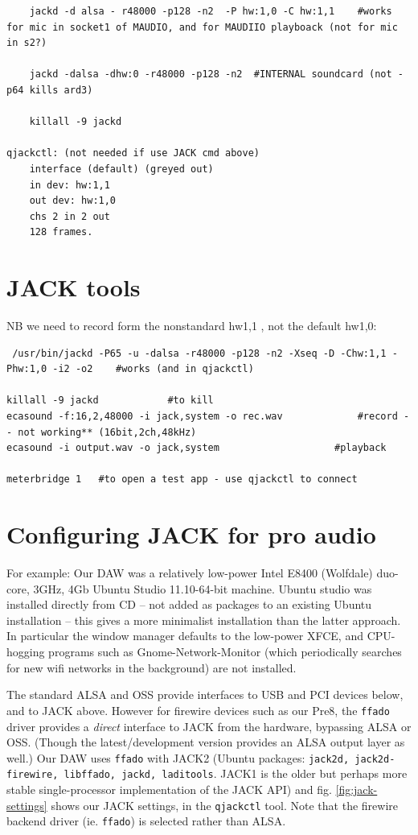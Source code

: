 \documentclass[oneside,english]{scrbook}
\begin{document}
\begin{lstlisting}
    jackd -d alsa - r48000 -p128 -n2  -P hw:1,0 -C hw:1,1    #works for mic in socket1 of MAUDIO, and for MAUDIIO playboack (not for mic in s2?)

	jackd -dalsa -dhw:0 -r48000 -p128 -n2  #INTERNAL soundcard (not -p64 kills ard3)
	
	killall -9 jackd

qjackctl: (not needed if use JACK cmd above)
	interface (default) (greyed out)
	in dev: hw:1,1
	out dev: hw:1,0	
	chs 2 in 2 out
	128 frames.
\end{lstlisting}

\section{JACK tools}
NB we need to record form the nonstandard hw1,1 , not the default hw1,0:

\begin{lstlisting}
 /usr/bin/jackd -P65 -u -dalsa -r48000 -p128 -n2 -Xseq -D -Chw:1,1 -Phw:1,0 -i2 -o2    #works (and in qjackctl)

killall -9 jackd			#to kill
ecasound -f:16,2,48000 -i jack,system -o rec.wav  			 #record -- not working** (16bit,2ch,48kHz)
ecasound -i output.wav -o jack,system 					 #playback

meterbridge 1   #to open a test app - use qjackctl to connect
\end{lstlisting}

\section{Configuring JACK for pro audio}

For example: Our DAW was a relatively low-power Intel E8400 (Wolfdale) duo-core, 3GHz, 4Gb Ubuntu Studio 11.10-64-bit machine.   Ubuntu studio was installed directly from CD -- not added as packages to an existing Ubuntu installation -- this gives a more minimalist installation than the latter approach.  In particular the window manager defaults to the low-power XFCE, and CPU-hogging programs such as Gnome-Network-Monitor (which periodically searches for new wifi networks in the background) are not installed.

The standard ALSA and OSS provide interfaces to USB and PCI devices below, and to JACK above.  However for firewire devices such as our Pre8, the {\tt ffado} driver  provides a {\em direct} interface to JACK from the hardware, bypassing ALSA or OSS.  (Though the latest/development version provides an ALSA output layer as well.)   Our DAW uses {\tt ffado} with JACK2 (Ubuntu packages: {\tt jack2d, jack2d-firewire, libffado, jackd, laditools}.  JACK1 is the older but perhaps more stable single-processor implementation of the JACK API) and fig. \ref{fig:jack-settings} shows our JACK settings, in the {\tt qjackctl} tool.  Note that the firewire backend driver (ie. {\tt ffado}) is selected rather than ALSA.
\end{document}
